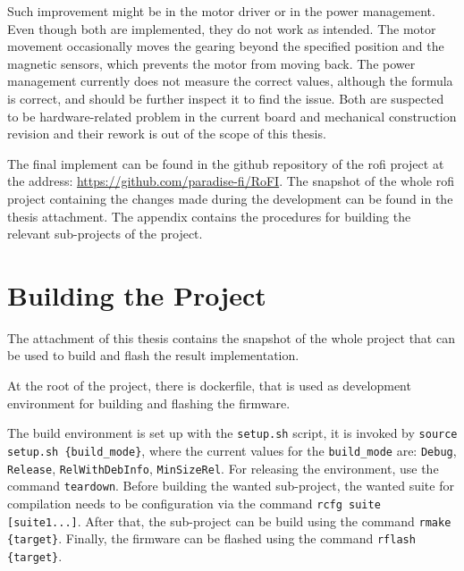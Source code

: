 \documentclass[
  digital,     %
  oneside,     %
  nosansbold,  %
  nocolorbold, %
  nolof,         %
  nolot,         %
]{fithesis4}
\newcommand{\TODO}[1]{\textcolor{red}{\textit{#1}}}
\newcommand{\TODOLIST}[1]{}
\begin{document}
{{{Such improvement might be in the motor driver or in the power management. Even though both are implemented, they do not work as intended. The motor movement occasionally moves the gearing beyond the specified position and the magnetic sensors, which prevents the motor from moving back. The power management currently does not measure the correct values, although the formula is correct, and should be further inspect it to find the issue. Both are suspected to be hardware-related problem in the current board and mechanical construction revision and their rework is out of the scope of this thesis.

The final implement can be found in the github repository of the \acrshort{rofi} project at the address: \url{https://github.com/paradise-fi/RoFI}. The snapshot of the whole \acrshort{rofi} project containing the changes made during the development can be found in the thesis attachment. The appendix contains the procedures for building the relevant sub-projects of the project.

\appendix %
\chapter{Building the Project}

\TODOLIST{
\begin{itemize}
    \item Setup project --- dev env = docker
    \item source setup.sh $\rightarrow$ compile roficom, compile hal example
    \item flashing roficom
    \item flashing esp32
\end{itemize}
}

The attachment of this thesis contains the snapshot of the whole project that can be used to build and flash the result implementation.

At the root of the project, there is dockerfile, that is used as development environment for building and flashing the firmware.

The build environment is set up with the \texttt{setup.sh} script, it is invoked by \texttt{source setup.sh \{build\_mode\}}, where the current values for the \texttt{build\_mode} are: \texttt{Debug}, \texttt{Release}, \texttt{RelWithDebInfo}, \texttt{MinSizeRel}. For releasing the environment, use the command \texttt{teardown}. Before building the wanted sub-project, the wanted suite for compilation needs to be configuration via the command \texttt{rcfg suite [suite1...]}. After that, the sub-project can be build using the command \texttt{rmake \{target\}}. Finally, the firmware can be flashed using the command \texttt{rflash \{target\}}.

}}}
\end{document}
